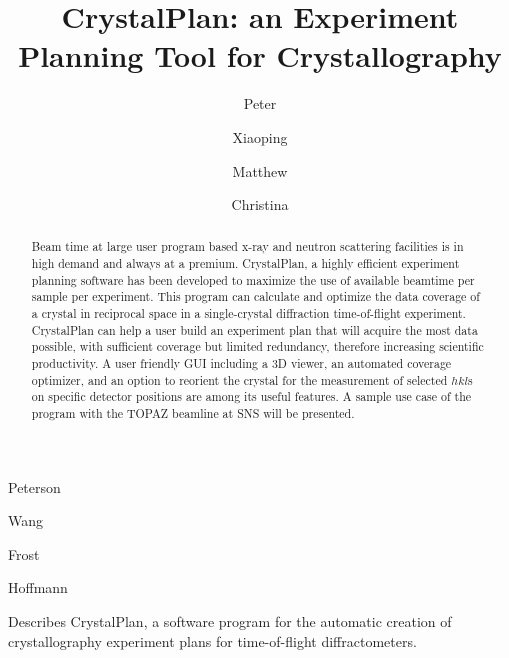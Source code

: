 \documentclass[final]{iucr}              %
\begin{document}


\title{CrystalPlan: an Experiment Planning Tool for Crystallography}



\author[]{Peter}{Peterson}
\author[]{Xiaoping}{Wang}
\author[]{Matthew}{Frost}
\author[]{Christina}{Hoffmann}







\maketitle                        %

\begin{synopsis}
Describes CrystalPlan, a software program for the automatic creation of 
crystallography experiment plans for time-of-flight diffractometers.
\end{synopsis}

\begin{abstract}
Beam time at large user program based x-ray and neutron scattering facilities is
in high demand and always at a premium. CrystalPlan, a highly efficient
experiment planning software has been developed to maximize the use of available
beamtime per sample per experiment. 
This program can calculate and optimize the data coverage of a crystal in
reciprocal space in a single-crystal diffraction time-of-flight experiment.
CrystalPlan can help a user build an experiment plan that will acquire the most
data possible, with sufficient coverage but limited redundancy, therefore
increasing scientific productivity. 
A user friendly GUI including a 3D viewer, an automated coverage optimizer,
and an option to reorient the crystal for the measurement 
of selected $hkl$s on specific detector positions 
are among its useful features. 
A sample use case of the program with the TOPAZ beamline at SNS will be
presented. 
\end{abstract}
\end{document}
